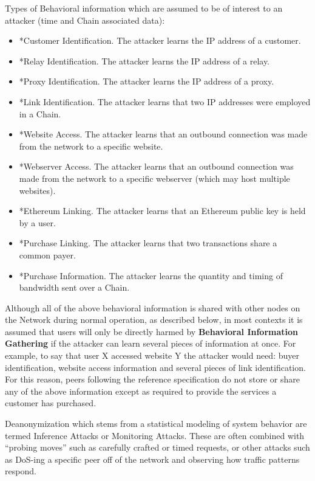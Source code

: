 Types of Behavioral information which are assumed to be of interest to an attacker (time and Chain associated data):

\begin{itemize}
\item *Customer Identification. The attacker learns the IP address of a customer.
\item *Relay Identification. The attacker learns the IP address of a relay.
\item *Proxy Identification. The attacker learns the IP address of a proxy.
\item *Link Identification. The attacker learns that two IP addresses were employed in a Chain.
\item *Website Access. The attacker learns that an outbound connection was made from the \Orchid{} network to a specific website.
\item *Webserver Access. The attacker learns that an outbound connection was made from the \Orchid{} network to a specific webserver (which may host multiple websites).
\item *Ethereum Linking. The attacker learns that an Ethereum public key is held by a \Orchid{} user.
\item *Purchase Linking. The attacker learns that two transactions share a common payer.
\item *Purchase Information. The attacker learns the quantity and timing of bandwidth sent over a Chain.
\end{itemize}

Although all of the above behavioral information is shared with other nodes on the \Orchid{} Network during normal operation, as described below, in most contexts it is assumed that users will only be directly harmed by \textbf{Behavioral Information Gathering} if the attacker can learn several pieces of information at once. For example, to say that user X accessed website Y the attacker would need: buyer identification, website access information and several pieces of link identification. For this reason, peers following the reference specification do not store or share any of the above information except as required to provide the services a customer has purchased.

Deanonymization which stems from a statistical modeling of system behavior are termed Inference Attacks or Monitoring Attacks. These are often combined with “probing moves” such as carefully crafted or timed requests, or other attacks such as DoS-ing a specific peer off of the network and observing how traffic patterns respond.


